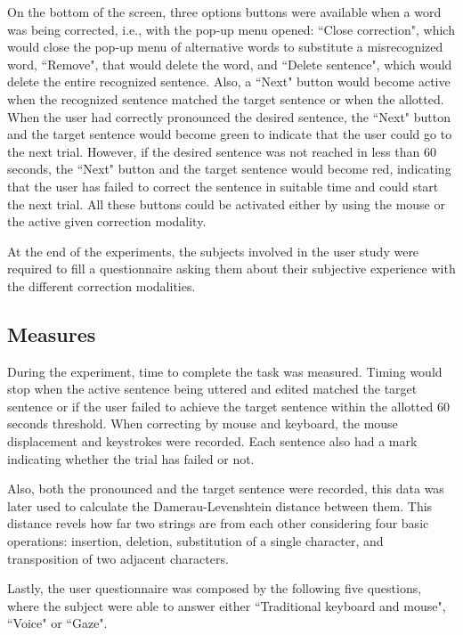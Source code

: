\documentclass[]{article}
\begin{document}
On the bottom of the screen, three options buttons were available when a word was being corrected, i.e., with the pop-up
menu opened: ``Close correction", which would close the pop-up menu of alternative words to substitute a misrecognized
word, ``Remove", that would delete the word, and ``Delete sentence", which would delete the entire recognized sentence.
Also, a ``Next" button would become active when the recognized sentence matched the target sentence or when the
allotted. When the user had correctly pronounced the desired sentence, the ``Next" button and the target sentence would
become green to indicate that the user could go to the next trial. However, if the desired sentence was not reached in
less than 60 seconds, the ``Next" button and the target sentence would become red, indicating that the user has failed
to correct the sentence in suitable time and could start the next trial. All these buttons could be activated either by
using the mouse or the active given correction modality.

At the end of the experiments, the subjects involved in the user study were required to fill a questionnaire asking them
about their subjective experience with the different correction modalities.


\subsection{Measures}
During the experiment, time to complete the task was measured.  Timing would stop when the active sentence being uttered
and edited matched the target sentence or if the user failed to achieve the target sentence within the allotted 60
seconds threshold. When correcting by mouse and keyboard, the mouse displacement and keystrokes were recorded.
Each sentence also had a mark indicating whether the trial has failed or not.


Also, both the pronounced and the target sentence were recorded, this data was later used to calculate the Damerau-Levenshtein
distance \cite{Damerau1964} between them. This distance revels how far two strings are from each other considering four basic operations: insertion,
deletion, substitution of a single character, and transposition of two adjacent characters.

Lastly, the user questionnaire was composed by the following five questions, where the subject were able to answer
either ``Traditional keyboard and mouse", ``Voice" or ``Gaze".
\end{document}
